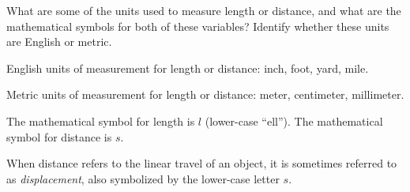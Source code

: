 

What are some of the units used to measure length or distance, and what are the mathematical symbols for both of these variables? Identify whether these units are English or metric.







English units of measurement for length or distance: inch, foot, yard, mile.

\vskip 10pt

Metric units of measurement for length or distance: meter, centimeter, millimeter.

\vskip 10pt

The mathematical symbol for length is $l$ (lower-case ``ell'').  The mathematical symbol for distance is $s$. 







When distance refers to the linear travel of an object, it is sometimes referred to as {\it displacement}, also symbolized by the lower-case letter $s$. 




